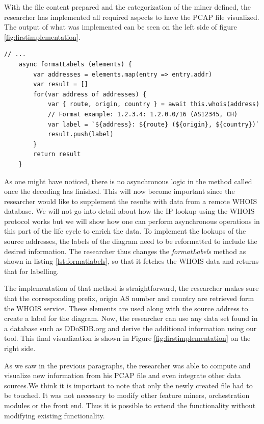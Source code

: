 With the file content prepared and the categorization of the miner defined, the researcher has implemented all required aspects to have the PCAP file visualized. The output of what was implemented can be seen on the left side of figure \ref{fig:firstimplementation}.

\begin{lstlisting}[caption={Initial content of the newly create Miner},label={lst:formatlabels}]
    // ...
    async formatLabels (elements) {
        var addresses = elements.map(entry => entry.addr)
        var result = []
        for(var address of addresses) {
            var { route, origin, country } = await this.whois(address)
            // Format example: 1.2.3.4: 1.2.0.0/16 (AS12345, CH)
            var label = `${address}: ${route} (${origin}, ${country})`
            result.push(label)
        }
        return result
    }
\end{lstlisting}

As one might have noticed, there is no asynchronous logic in the method called once the decoding has finished. This will now become important since the researcher would like to supplement the results with data from a remote WHOIS database. We will not go into detail about how the IP lookup using the WHOIS protocol works but we will show how one can perform asynchronous operations in this part of the life cycle to enrich the data.
To implement the lookups of the source addresses, the labels of the diagram need to be reformatted to include the desired information. The researcher thus changes the \textit{formatLabels} method as shown in listing \ref{lst:formatlabels}, so that it fetches the WHOIS data and returns that for labelling.

The implementation of that method is straightforward, the researcher makes sure that the corresponding prefix, origin AS number and country are retrieved form the WHOIS service. These elements are used along with the source address to create a label for the diagram. Now, the researcher can use any data set found in a database such as DDoSDB.org and derive the additional information using our tool. This final visualization is shown in Figure \ref{fig:firstimplementation} on the right side.

As we saw in the previous paragraphs, the researcher was able to compute and visualize new information from his PCAP file and even integrate other data sources.We think it is important to note that only the newly created file had to be touched. It was not necessary to modify other feature miners, orchestration modules or the front end. Thus it is possible to extend the functionality without modifying existing functionality.

